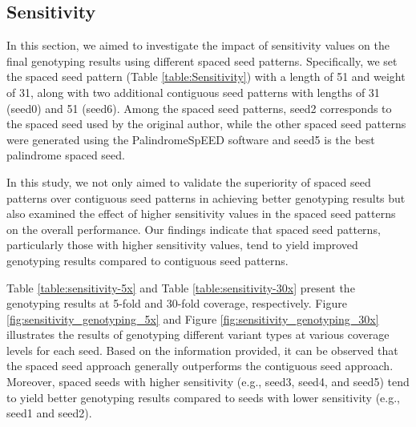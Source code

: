 \documentclass{PHlab-thesis}
\begin{document}
\subsection{Sensitivity}
In this section, we aimed to investigate the impact of sensitivity values on the final genotyping results using different spaced seed patterns. Specifically, we set the spaced seed pattern (Table \ref{table:Sensitivity}) with a length of 51 and weight of 31, along with two additional contiguous seed patterns with lengths of 31 (seed0) and 51 (seed6). Among the spaced seed patterns, seed2 corresponds to the spaced seed used by the original author, while the other spaced seed patterns were generated using the PalindromeSpEED software and seed5 is the best palindrome spaced seed.

In this study, we not only aimed to validate the superiority of spaced seed patterns over contiguous seed patterns in achieving better genotyping results but also examined the effect of higher sensitivity values in the spaced seed patterns on the overall performance. Our findings indicate that spaced seed patterns, particularly those with higher sensitivity values, tend to yield improved genotyping results compared to contiguous seed patterns.

Table \ref{table:sensitivity-5x} and Table \ref{table:sensitivity-30x} present the genotyping results at 5-fold and 30-fold coverage, respectively. Figure \ref{fig:sensitivity_genotyping_5x} and Figure \ref{fig:sensitivity_genotyping_30x} illustrates the results of genotyping different variant types at various coverage levels for each seed. Based on the information provided, it can be observed that the spaced seed approach generally outperforms the contiguous seed approach. Moreover, spaced seeds with higher sensitivity (e.g., seed3, seed4, and seed5) tend to yield better genotyping results compared to seeds with lower sensitivity (e.g., seed1 and seed2).
\end{document}
